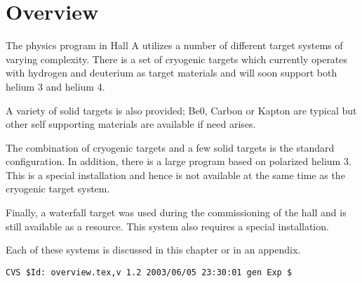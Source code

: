 \section{ Overview}

The physics program in Hall A utilizes a number of different
target systems of varying complexity. There is a set of
cryogenic targets which currently operates with hydrogen and deuterium
as target materials and will soon support both helium 3 and
helium 4.

A variety of solid targets is also provided; Be0, Carbon or
Kapton are typical but other self supporting materials are available if need arises.

The combination of cryogenic targets and a few solid targets is
the standard configuration. In addition,
there is a large program based on polarized helium 3. This
is a special installation and hence is not available at the same
time as the cryogenic target system.

Finally, a waterfall target was used during the commissioning of
the hall and is still available as a resource. This system
also requires a special installation.

Each of these systems is discussed in this chapter or in an appendix.
%
%
{\small
\begin{verbatim}CVS $Id: overview.tex,v 1.2 2003/06/05 23:30:01 gen Exp $\end{verbatim}
}
